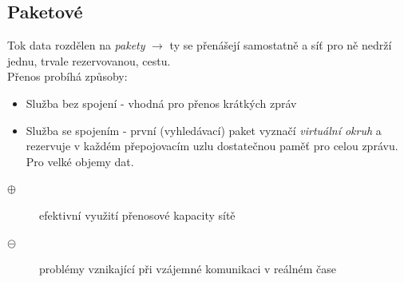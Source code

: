 \subsection{Paketové}
Tok data rozdělen na \textit{pakety} $\rightarrow$ ty se přenášejí samostatně a síť pro ně nedrží jednu, trvale rezervovanou, cestu.\\
Přenos probíhá způsoby:
\begin{itemize}
	\item Služba bez spojení - vhodná pro přenos krátkých zpráv
	\item Služba se spojením - první (vyhledávací) paket vyznačí \textit{virtuální okruh} a rezervuje v každém přepojovacím uzlu dostatečnou paměť pro celou zprávu. Pro velké objemy dat.
\end{itemize}
	\begin{description}	
	\item[$\oplus$] efektivní využití přenosové kapacity sítě
	\item[$\circleddash$] problémy vznikající při vzájemné komunikaci v reálném čase
\end{description}
